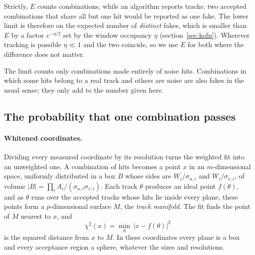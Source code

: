 \IfFileExists{jinst.cls}{\documentclass[a4paper,11pt]{jinst}}
\begin{document}
Strictly, $E$ counts combinations, while an algorithm reports tracks: two accepted
combinations that share all but one hit would be reported as one fake. The lower limit is
therefore on the expected number of \emph{distinct} fakes, which is smaller than $E$ by a factor
$e^{-\eta/2}$ set by the window occupancy $\eta$ (section~\ref{sec:kofn}). Wherever tracking is
possible $\eta\ll1$ and the two coincide, so we use $E$ for both where the difference does not
matter.

The limit counts only combinations made entirely of noise hits. Combinations in which some
hits belong to a real track and others are noise are also fakes in the usual sense; they only
add to the number given here.

\subsection{The probability that one combination passes}\label{sec:method}

\paragraph{Whitened coordinates.} Dividing every measured coordinate by its resolution turns
the weighted fit into an unweighted one. A combination of hits becomes a point $x$ in an
$m$-dimensional space, uniformly distributed in a box $B$ whose sides are $W_i/\sigma_{u,i}$
and $W_i/\sigma_{v,i}$, of volume $|B|=\prod_i A_i/(\sigma_{u,i}\sigma_{v,i})$. Each track
$\theta$ produces an ideal point $f(\theta)$, and as $\theta$ runs over the accepted tracks
whose hits lie inside every plane, these points form a $p$-dimensional surface $M$, the
\emph{track manifold}. The fit finds the point of $M$ nearest to $x$, and
\begin{equation}
  \chi^2(x) = \min_{\theta}\,\lvert x-f(\theta)\rvert^2
\end{equation}
is the squared distance from $x$ to $M$. In these coordinates every plane is a box and every
acceptance region a sphere, whatever the sizes and resolutions.
\end{document}
